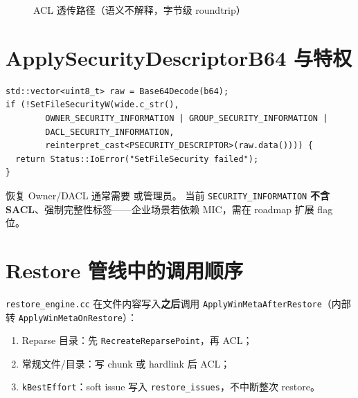 \begin{figure}[htbp]
\centering
{}
\caption{ACL 透传路径（语义不解释，字节级 roundtrip）}
\end{figure}

\section{ApplySecurityDescriptorB64 与特权}

\begin{lstlisting}[caption={恢复写 SD (win\_meta.cc)}]
std::vector<uint8_t> raw = Base64Decode(b64);
if (!SetFileSecurityW(wide.c_str(),
        OWNER_SECURITY_INFORMATION | GROUP_SECURITY_INFORMATION |
        DACL_SECURITY_INFORMATION,
        reinterpret_cast<PSECURITY_DESCRIPTOR>(raw.data()))) {
  return Status::IoError("SetFileSecurity failed");
}
\end{lstlisting}

\begin{warnbox}
恢复 Owner/DACL 通常需要  或管理员。
当前 \texttt{SECURITY\_INFORMATION} \textbf{不含 SACL}、强制完整性标签——企业场景若依赖 MIC，需在 roadmap 扩展 flag 位。
\end{warnbox}

\section{Restore 管线中的调用顺序}

\texttt{restore\_engine.cc} 在文件内容写入\textbf{之后}调用 \texttt{ApplyWinMetaAfterRestore}（内部转 \texttt{ApplyWinMetaOnRestore}）：

\begin{enumerate}[nosep]
  \item Reparse 目录：先 \texttt{RecreateReparsePoint}，再 ACL；
  \item 常规文件/目录：写 chunk 或 hardlink 后 ACL；
  \item \texttt{kBestEffort}：soft issue 写入 \texttt{restore\_issues}，不中断整次 restore。
\end{enumerate}

